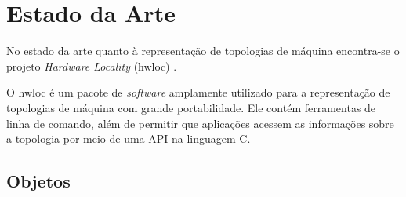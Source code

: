 \chapter{Estado da Arte} %
\label{cap:estado_da_arte}
\acresetall


No estado da arte quanto à representação de topologias de máquina encontra-se o projeto \textit{Hardware Locality} (hwloc) \cite{hwloc2010}.

O hwloc é um pacote de \textit{software} amplamente utilizado para a representação de topologias de máquina com grande portabilidade.
Ele contém ferramentas de linha de comando, além de permitir que aplicações acessem as informações sobre a topologia por meio de uma API na linguagem C.



\section{Objetos}
\label{sec:objetos}

